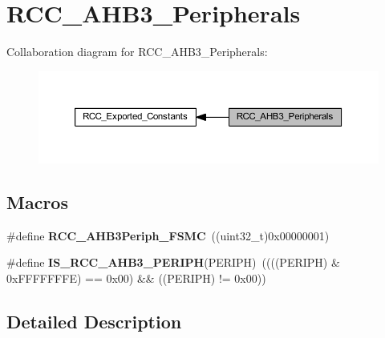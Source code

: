 \hypertarget{group___r_c_c___a_h_b3___peripherals}{}\section{R\+C\+C\+\_\+\+A\+H\+B3\+\_\+\+Peripherals}
\label{group___r_c_c___a_h_b3___peripherals}
Collaboration diagram for R\+C\+C\+\_\+\+A\+H\+B3\+\_\+\+Peripherals\+:\nopagebreak
\begin{figure}[H]
\begin{center}
\leavevmode
\includegraphics[width=350pt]{group___r_c_c___a_h_b3___peripherals}
\end{center}
\end{figure}
\subsection*{Macros}
\begin{DoxyCompactItemize}
\item 
\mbox{\label{group___r_c_c___a_h_b3___peripherals_gaa305538e5105917baf53039c5643a361}} 
\#define {\bfseries R\+C\+C\+\_\+\+A\+H\+B3\+Periph\+\_\+\+F\+S\+MC}~((uint32\+\_\+t)0x00000001)
\item 
\mbox{\label{group___r_c_c___a_h_b3___peripherals_ga8d269d2fbf78cf494ea127d1a6daec31}} 
\#define {\bfseries I\+S\+\_\+\+R\+C\+C\+\_\+\+A\+H\+B3\+\_\+\+P\+E\+R\+I\+PH}(P\+E\+R\+I\+PH)~((((P\+E\+R\+I\+PH) \& 0x\+F\+F\+F\+F\+F\+F\+F\+E) == 0x00) \&\& ((\+P\+E\+R\+I\+P\+H) != 0x00))
\end{DoxyCompactItemize}


\subsection{Detailed Description}
